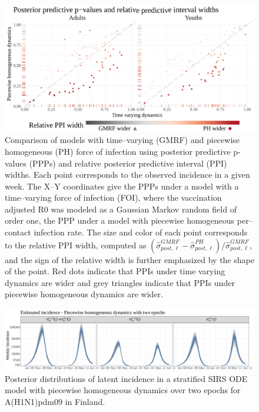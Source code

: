 \begin{figure}[htbp]
	\centering
	\includegraphics[width=0.9\linewidth]{figures/flu_rw_const_ppicomp}
	\caption[Comparison with posterior predictive p-values and relative predictive interval widths for SIRS models with time varying and piecewise homogeneous dynamics.]{Comparison of models with time--varying (GMRF) and piecewise homogeneous (PH) force of infection using posterior predictive p-values (PPPs) and relative posterior predictive interval (PPI) widths. Each point corresponds to the observed incidence in a given week. The X--Y coordinates give the PPPs under a model with a time--varying force of infection (FOI), where the vaccination adjusted R0 was modeled as a Gaussian Markov random field of order one, the PPP under a model with piecewise homogeneous per--contact infection rate. The size and color of each point corresponds to the relative PPI width, computed as $ (\widehat{\sigma}_{post,\ell}^{GMRF} - \widehat{\sigma}_{post,\ell}^{PH})/\widehat{\sigma}_{post,\ell}^{GMRF} $, and the sign of the relative width is further emphasized by the shape of the point. Red dots indicate that PPIs under time varying dynamics are wider and grey triangles indicate that PPIs under piecewise homogeneous dynamics are wider.}
	\label{fig:flu_rw_const_ppicomp}
\end{figure}

\begin{figure}[htbp]
	\centering
	\includegraphics[width=\linewidth]{figures/flu_incid_2epoch_ode}
	\caption{Posterior distributions of latent incidence in a stratified SIRS ODE model with piecewise homogeneous dynamics over two epochs for A(H1N1)pdm09 in Finland.}
	\label{fig:fluincid2epochode}
\end{figure}

